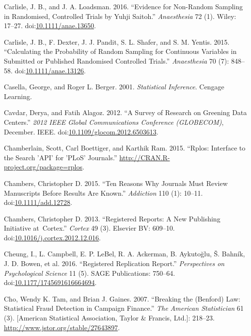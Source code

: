\documentclass[a5paper]{book}
\begin{document}
\hypertarget{ref-doi:10.1111ux2fanae.13650}{}
Carlisle, J. B., and J. A. Loadsman. 2016. ``Evidence for Non-Random
Sampling in Randomised, Controlled Trials by Yuhji Saitoh.''
\emph{Anaesthesia} 72 (1). Wiley: 17--27.
doi:\href{https://doi.org/10.1111/anae.13650}{10.1111/anae.13650}.

\hypertarget{ref-doi:10.1111ux2fanae.13126}{}
Carlisle, J. B., F. Dexter, J. J. Pandit, S. L. Shafer, and S. M.
Yentis. 2015. ``Calculating the Probability of Random Sampling for
Continuous Variables in Submitted or Published Randomised Controlled
Trials.'' \emph{Anaesthesia} 70 (7): 848--58.
doi:\href{https://doi.org/10.1111/anae.13126}{10.1111/anae.13126}.

\hypertarget{ref-isbn:9780534243128}{}
Casella, George, and Roger L. Berger. 2001. \emph{Statistical
Inference}. Cengage Learning.

\hypertarget{ref-doi:10.1109ux2fglocom.2012.6503613}{}
Cavdar, Derya, and Fatih Alagoz. 2012. ``A Survey of Research on
Greening Data Centers.'' \emph{2012 IEEE Global Communications
Conference (GLOBECOM)}, December. IEEE.
doi:\href{https://doi.org/10.1109/glocom.2012.6503613}{10.1109/glocom.2012.6503613}.

\hypertarget{ref-Chamberlain2015-tg}{}
Chamberlain, Scott, Carl Boettiger, and Karthik Ram. 2015. ``Rplos:
Interface to the Search 'API' for 'PLoS' Journals.''
\url{http://CRAN.R-project.org/package=rplos}.

\hypertarget{ref-doi:10.1111ux2fadd.12728}{}
Chambers, Christopher D. 2015. ``Ten Reasons Why Journals Must Review
Manuscripts Before Results Are Known.'' \emph{Addiction} 110 (1):
10--11. doi:\href{https://doi.org/10.1111/add.12728}{10.1111/add.12728}.

\hypertarget{ref-doi:10.1016ux2fj.cortex.2012.12.016}{}
Chambers, Christopher D. 2013. ``Registered Reports: A New Publishing
Initiative at~Cortex.'' \emph{Cortex} 49 (3). Elsevier BV: 609--10.
doi:\href{https://doi.org/10.1016/j.cortex.2012.12.016}{10.1016/j.cortex.2012.12.016}.

\hypertarget{ref-doi:10.1177ux2f1745691616664694}{}
Cheung, I., L. Campbell, E. P. LeBel, R. A. Ackerman, B. Aykutoğlu, Š.
Bahník, J. D. Bowen, et al. 2016. ``Registered Replication Report.''
\emph{Perspectives on Psychological Science} 11 (5). SAGE Publications:
750--64.
doi:\href{https://doi.org/10.1177/1745691616664694}{10.1177/1745691616664694}.

\hypertarget{ref-doi:10.2307ux2f27643897}{}
Cho, Wendy K. Tam, and Brian J. Gaines. 2007. ``Breaking the (Benford)
Law: Statistical Fraud Detection in Campaign Finance.'' \emph{The
American Statistician} 61 (3). {[}American Statistical Association,
Taylor \& Francis, Ltd.{]}: 218--23.
\url{http://www.jstor.org/stable/27643897}.
\end{document}
